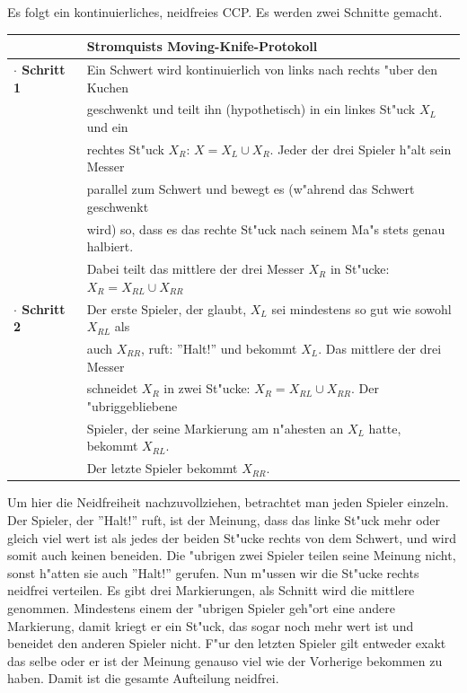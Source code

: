 \documentclass[11pt, a4paper, twoside]{article}
\numberwithin{equation}{section}
\begin{document}
Es folgt ein kontinuierliches, neidfreies CCP. Es werden zwei Schnitte gemacht.\\
\newline
\begin{tabular}{|ll|}
\hline
&\textbf{Stromquists Moving-Knife-Protokoll}\\
\hline
\textbf{$\cdot$ Schritt 1}& Ein Schwert wird kontinuierlich von links nach rechts "uber den Kuchen\\&geschwenkt und teilt ihn (hypothetisch) in ein linkes St"uck $X_L$ und ein\\&rechtes St"uck $X_R$: $X=X_L\cup X_R$. Jeder der drei Spieler h"alt sein Messer\\&parallel zum Schwert und bewegt es (w"ahrend das Schwert geschwenkt\\&wird) so, dass es das rechte St"uck nach seinem Ma"s stets genau halbiert.\\&Dabei teilt das mittlere der drei Messer $X_R$ in St"ucke:$X_R=X_{RL}\cup X_{RR}$\\
\textbf{$\cdot$ Schritt 2}& Der erste Spieler, der glaubt, $X_L$ sei mindestens so gut wie sowohl $X_{RL}$ als\\&auch $ X_{RR}$, ruft: ''Halt!'' und bekommt $X_L$. Das mittlere der drei Messer\\&schneidet $X_R$ in zwei St"ucke: $X_R=X_{RL}\cup X_{RR}$. Der "ubriggebliebene\\& Spieler, der seine Markierung am n"ahesten an $X_L$ hatte, bekommt $X_{RL}$.\\&Der letzte Spieler bekommt $X_{RR}$.\\     
\hline
\end{tabular}
\newline
\newline
\newline
Um hier die Neidfreiheit nachzuvollziehen, betrachtet man jeden Spieler einzeln. Der Spieler, der ''Halt!'' ruft, ist der Meinung, dass das linke St"uck mehr oder gleich viel wert ist als jedes der beiden St"ucke rechts von dem Schwert, und wird somit auch keinen beneiden. Die "ubrigen zwei Spieler teilen seine Meinung nicht, sonst h"atten sie auch ''Halt!'' gerufen. Nun m"ussen wir die St"ucke rechts neidfrei verteilen. Es gibt drei Markierungen, als Schnitt wird die mittlere genommen. Mindestens einem der "ubrigen Spieler geh"ort eine andere Markierung, damit kriegt er ein St"uck, das sogar noch mehr wert ist und beneidet den anderen Spieler nicht. F"ur den letzten Spieler gilt entweder exakt das selbe oder er ist der Meinung genauso viel wie der Vorherige bekommen zu haben. Damit ist die gesamte Aufteilung neidfrei.\\
\end{document}
